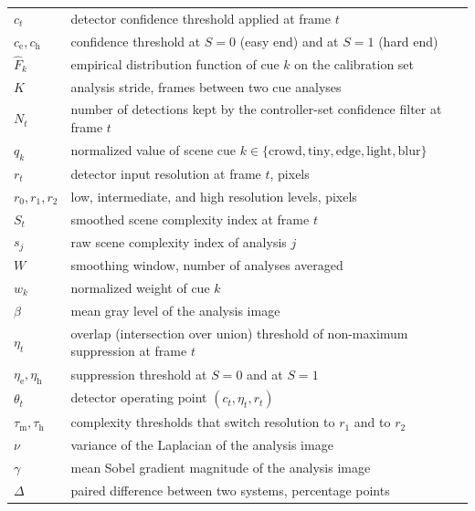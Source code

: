\documentclass[journal]{new-aiaa}
\begin{document}
{\renewcommand\arraystretch{1.0}
\noindent\begin{longtable}{@{}l @{\quad=\quad} l@{}}
$c_t$ & detector confidence threshold applied at frame $t$ \\
$c_{\mathrm{e}}, c_{\mathrm{h}}$ & confidence threshold at $S=0$ (easy end) and at $S=1$ (hard end) \\
$\hat F_k$ & empirical distribution function of cue $k$ on the calibration set \\
$K$ & analysis stride, frames between two cue analyses \\
$N_{t}$ & number of detections kept by the controller-set confidence filter at frame $t$ \\
$q_k$ & normalized value of scene cue $k \in \{\mathrm{crowd}, \mathrm{tiny}, \mathrm{edge}, \mathrm{light}, \mathrm{blur}\}$ \\
$r_t$ & detector input resolution at frame $t$, pixels \\
$r_0, r_1, r_2$ & low, intermediate, and high resolution levels, pixels \\
$S_t$ & smoothed scene complexity index at frame $t$ \\
$s_j$ & raw scene complexity index of analysis $j$ \\
$W$ & smoothing window, number of analyses averaged \\
$w_k$ & normalized weight of cue $k$ \\
$\beta$ & mean gray level of the analysis image \\
$\eta_t$ & overlap (intersection over union) threshold of non-maximum suppression at frame $t$ \\
$\eta_{\mathrm{e}}, \eta_{\mathrm{h}}$ & suppression threshold at $S=0$ and at $S=1$ \\
$\theta_t$ & detector operating point $(c_t, \eta_t, r_t)$ \\
$\tau_{\mathrm{m}}, \tau_{\mathrm{h}}$ & complexity thresholds that switch resolution to $r_1$ and to $r_2$ \\
$\nu$ & variance of the Laplacian of the analysis image \\
$\gamma$ & mean Sobel gradient magnitude of the analysis image \\
$\Delta$ & paired difference between two systems, percentage points \\
\end{longtable}}
\addtocounter{table}{-1}
\end{document}
